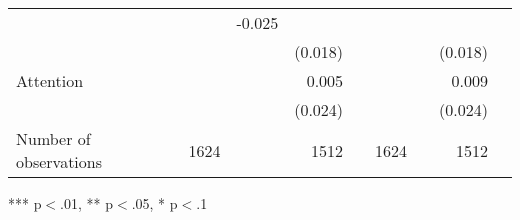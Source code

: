 \documentclass{article}
\begin{document}
\begin{table}[!h]
\begin{tabular}{lllllllll}
  \multicolumn{1}{r}{} &
  \multicolumn{1}{l}{} &
  \multicolumn{1}{r}{-0.025} &
  \multicolumn{1}{l}{} \\
\multicolumn{1}{l}{} &
  \multicolumn{1}{r}{} &
  \multicolumn{1}{l}{} &
  \multicolumn{1}{r}{(0.018)} &
  \multicolumn{1}{l}{} &
  \multicolumn{1}{r}{} &
  \multicolumn{1}{l}{} &
  \multicolumn{1}{r}{(0.018)} &
  \multicolumn{1}{l}{} \\
\multicolumn{1}{l}{Attention} &
  \multicolumn{1}{r}{} &
  \multicolumn{1}{l}{} &
  \multicolumn{1}{r}{0.005} &
  \multicolumn{1}{l}{} &
  \multicolumn{1}{r}{} &
  \multicolumn{1}{l}{} &
  \multicolumn{1}{r}{0.009} &
  \multicolumn{1}{l}{} \\
\multicolumn{1}{l}{} &
  \multicolumn{1}{r}{} &
  \multicolumn{1}{l}{} &
  \multicolumn{1}{r}{(0.024)} &
  \multicolumn{1}{l}{} &
  \multicolumn{1}{r}{} &
  \multicolumn{1}{l}{} &
  \multicolumn{1}{r}{(0.024)} &
  \multicolumn{1}{l}{} \\
\multicolumn{1}{l}{Number of observations} &
  \multicolumn{1}{r}{1624} &
  \multicolumn{1}{l}{} &
  \multicolumn{1}{r}{1512} &
  \multicolumn{1}{l}{} &
  \multicolumn{1}{r}{1624} &
  \multicolumn{1}{l}{} &
  \multicolumn{1}{r}{1512} &
  \multicolumn{1}{l}{} \\
\cline{1-9}
\end{tabular}

\footnotesize{
*** p$<$.01, ** p$<$.05, * p$<$.1
}
\end{table}
\end{document}

